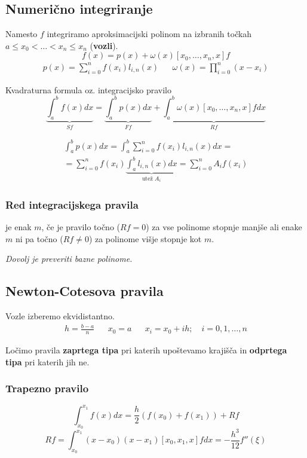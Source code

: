 \begin{multicols}{5}
\section*{Numerično integriranje}

Namesto $f$ integriramo aproksimacijski polinom na izbranih točkah $a \leq x_0 < \dots < x_n \leq x_n$ (\textbf{vozli}).
\[
f(x) = p(x) + \omega(x) [x_0, \dots, x_n, x] f
\]
\begin{align*}
    p(x) = \sum_{i=0}^n f(x_i) l_{i,n}(x) && \omega(x) = \prod_{i=0}^n (x-x_i)
\end{align*}

Kvadraturna formula oz. integracijsko pravilo
\[
\underbrace{\int_a^b f(x) dx}_{Sf} =
\underbrace{\int_a^b p(x) dx}_{Ff} +
\underbrace{\int_a^b \omega(x)[x_0, \dots, x_n, x]f dx}_{Rf} 
\]

\begin{multline*}  
    \int_a^b p(x) dx = 
    \int_a^b \sum_{i=0}^n f(x_i) l_{i,n}(x) dx = \\
    = \sum_{i=0}^n f(x_i) \underbrace{\int_a^b l_{i,n}(x) dx}_{\text{utež } A_i} = 
    \sum_{i=0}^n A_i f(x_i)
\end{multline*}

\subsubsection*{Red integracijskega pravila}
je enak $m$, če je pravilo točno ($Rf = 0$) za vse polinome stopnje manjše ali enake $m$ ni pa točno ($Rf \neq 0$) za polinome višje stopnje kot $m$.

\textit{Dovolj je preveriti bazne polinome.}

\subsection*{Newton-Cotesova pravila}
Vozle izberemo ekvidistantno.
\begin{align*}
    h = \frac{b-a}{n} && x_0 = a && x_i = x_0 + ih; \quad i = 0, 1, \dots, n
\end{align*}

Ločimo pravila \textbf{zaprtega tipa} pri katerih upoštevamo krajišča in \textbf{odprtega tipa} pri katerih jih ne.

\subsubsection*{Trapezno pravilo}
\[ \int_{x_0}^{x_1} f(x) dx = \frac{h}{2} (f(x_0) + f(x_1)) + Rf\]
\[ Rf = \int_{x_0}^{x_1} (x-x_0)(x-x_1) [x_0, x_1, x] f dx = -\frac{h^3}{12} f''(\xi)\]


\end{multicols}
